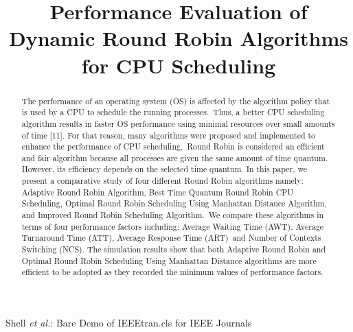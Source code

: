 \documentclass[conference]{IEEEtran}
\begin{document}
    {Shell \MakeLowercase{\textit{et al.}}: Bare Demo of IEEEtran.cls for IEEE Journals}

    \title{Performance Evaluation of Dynamic Round Robin Algorithms for CPU Scheduling}

    \author{
        \vspace{1em}
    }

    \maketitle

    \begin{abstract}
        The performance of an operating system (OS) is
        affected by the algorithm policy that is used by a CPU
        to schedule the running processes.~Thus, a better CPU
        scheduling algorithm results in faster OS performance
        using minimal resources over small amounts of time [11].
        For that reason, many algorithms were proposed and implemented
        to enhance the performance of CPU scheduling.~Round Robin is
        considered an efficient and fair algorithm because all
        processes are given the same amount of time quantum.
        However, its efficiency depends on the selected time quantum.
        In this paper, we present a comparative study of four different
        Round Robin algorithms namely: Adaptive Round Robin Algorithm,
        Best Time Quantum Round Robin CPU Scheduling, Optimal Round
        Robin Scheduling Using Manhattan Distance Algorithm, and
        Improved Round Robin Scheduling Algorithm.~We compare these
        algorithms in terms of four performance factors including:
        Average Waiting Time (AWT), Average Turnaround Time (ATT),
        Average Response Time (ART)~and Number of Contexts Switching (NCS).
        The simulation results show that both Adaptive Round Robin
        and Optimal Round Robin Scheduling Using Manhattan Distance
        algorithms are more efficient to be adopted as they recorded
        the minimum values of performance factors.
    \end{abstract}
\end{document}
